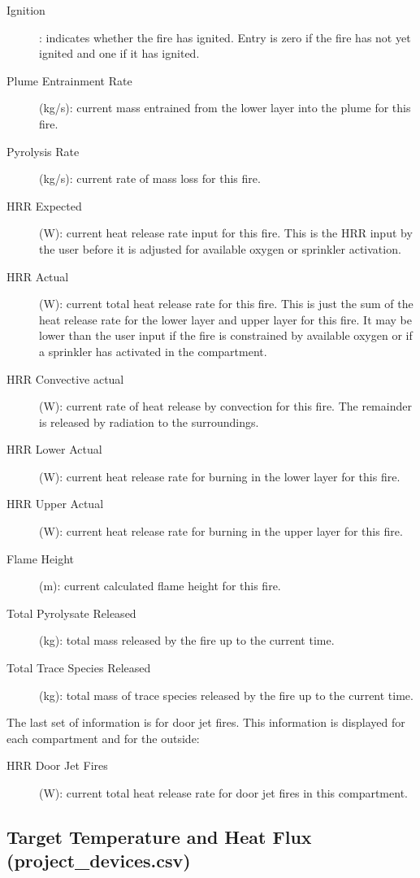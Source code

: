 \begin{description}
\item[Ignition]: indicates whether the fire has ignited. Entry is zero if the fire has not yet ignited and one if it has ignited.
\item[Plume Entrainment Rate] (kg/s): current mass entrained from the lower layer into the plume for this fire.
\item[Pyrolysis Rate] (kg/s): current rate of mass loss for this fire.
\item[HRR Expected] (W): current heat release rate input for this fire. This is the HRR input by the user before it is adjusted for available oxygen or sprinkler activation.
\item[HRR Actual] (W): current total heat release rate for this fire. This is just the sum of the heat release rate for the lower layer and upper layer for this fire. It may be lower than the user input if the fire is constrained by available oxygen or if a sprinkler has activated in the compartment.
\item[HRR Convective actual] (W): current rate of heat release by convection for this fire.  The remainder is released by radiation to the surroundings.
\item[HRR Lower Actual] (W): current heat release rate for burning in the lower layer for this fire.
\item[HRR Upper Actual] (W):  current heat release rate for burning in the upper layer for this fire.
\item[Flame Height] (m): current calculated flame height for this fire.
\item[Total Pyrolysate Released] (kg): total mass released by the fire up to the current time.
\item[Total Trace Species Released] (kg): total mass of trace species released by the fire up to the current time.
\end{description}
The last set of information is for door jet fires. This information is displayed for each compartment and for the outside:

\begin{description}
  \item[HRR Door Jet Fires] (W): current total heat release rate for door jet fires in this compartment.
\end{description}


\subsection{Target Temperature and Heat Flux (project\_devices.csv)}

